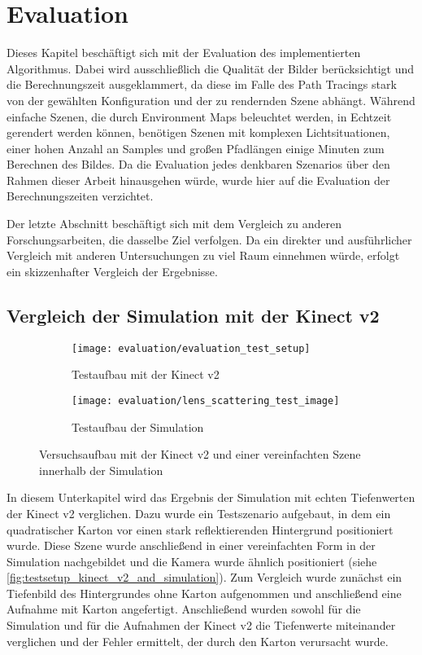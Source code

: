 \documentclass[thesis.tex]{subfiles}
\begin{document}
\chapter{Evaluation}
\label{chap:evaluation}

Dieses Kapitel beschäftigt sich mit der Evaluation des implementierten Algorithmus. Dabei wird ausschließlich die Qualität der Bilder berücksichtigt und die Berechnungszeit ausgeklammert, da diese im Falle des Path Tracings stark von der gewählten Konfiguration und der zu rendernden Szene abhängt. Während einfache Szenen, die durch Environment Maps beleuchtet werden, in Echtzeit gerendert werden können, benötigen Szenen mit komplexen Lichtsituationen, einer hohen Anzahl an Samples und großen Pfadlängen einige Minuten zum Berechnen des Bildes. Da die Evaluation jedes denkbaren Szenarios über den Rahmen dieser Arbeit hinausgehen würde, wurde hier auf die Evaluation der Berechnungszeiten verzichtet.

Der letzte Abschnitt beschäftigt sich mit dem Vergleich zu anderen Forschungsarbeiten, die dasselbe Ziel verfolgen. Da ein direkter und ausführlicher Vergleich mit anderen Untersuchungen zu viel Raum einnehmen würde, erfolgt ein skizzenhafter Vergleich der Ergebnisse.

\section{Vergleich der Simulation mit der Kinect v2}

\begin{figure}[h!]
\centering
\begin{subfigure}{0.49\textwidth}
    \texttt{[image: evaluation/evaluation\_test\_setup]}
    \caption{Testaufbau mit der Kinect v2}
\end{subfigure}
\begin{subfigure}{0.49\textwidth}
    \texttt{[image: evaluation/lens\_scattering\_test\_image]}
    \caption{Testaufbau der Simulation}
\end{subfigure}
\caption{Versuchsaufbau mit der Kinect v2 und einer vereinfachten Szene innerhalb der Simulation}
\label{fig:testsetup_kinect_v2_and_simulation}
\end{figure}

In diesem Unterkapitel wird das Ergebnis der Simulation mit echten Tiefenwerten der Kinect v2 verglichen. Dazu wurde ein Testszenario aufgebaut, in dem ein quadratischer Karton vor einen stark reflektierenden Hintergrund positioniert wurde. Diese Szene wurde anschließend in einer vereinfachten Form in der Simulation nachgebildet und die Kamera wurde ähnlich positioniert (siehe \autoref{fig:testsetup_kinect_v2_and_simulation}). Zum Vergleich wurde zunächst ein Tiefenbild des Hintergrundes ohne Karton aufgenommen und anschließend eine Aufnahme mit Karton angefertigt. Anschließend wurden sowohl für die Simulation und für die Aufnahmen der Kinect v2 die Tiefenwerte miteinander verglichen und der Fehler ermittelt, der durch den Karton verursacht wurde.
\end{document}
